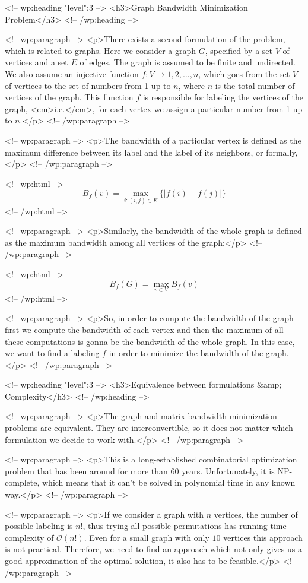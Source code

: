<!-- wp:heading {"level":3} -->
<h3>Graph Bandwidth Minimization Problem</h3>
<!-- /wp:heading -->

<!-- wp:paragraph -->
<p>There exists a second formulation of the problem, which is related to graphs. Here we consider a graph $G$, specified by a set $V$ of vertices and a set $E$ of edges. The graph is assumed to be finite and undirected. We also assume an injective function $f: V \rightarrow {1,2,\dots,n}$, which goes from the set $V$ of vertices to the set of numbers from 1 up to $n$, where $n$ is the total number of vertices of the graph. This function $f$ is responsible for labeling the vertices of the graph, <em>i.e.</em>, for each vertex we assign a particular number from 1 up to $n$.</p>
<!-- /wp:paragraph -->

<!-- wp:paragraph -->
<p>The bandwidth of a particular vertex is defined as the maximum difference between its label and the label of its neighbors, or formally,</p>
<!-- /wp:paragraph -->

<!-- wp:html -->
$$ B_f(v) = \max_{i:(i,j) \in E }\{|f(i) - f(j)|\} $$
<!-- /wp:html -->

<!-- wp:paragraph -->
<p>Similarly, the bandwidth of the whole graph is defined as the maximum bandwidth among all vertices of the graph:</p>
<!-- /wp:paragraph -->

<!-- wp:html -->
$$ B_f(G) = \max_{v \in V} B_f(v) $$
<!-- /wp:html -->

<!-- wp:paragraph -->
<p>So, in order to compute the bandwidth of the graph first we compute the bandwidth of each vertex and then the maximum of all these computations is gonna be the bandwidth of the whole graph. In this case, we want to find a labeling $f$ in order to minimize the bandwidth of the graph.</p>
<!-- /wp:paragraph -->

<!-- wp:heading {"level":3} -->
<h3>Equivalence between formulations &amp; Complexity</h3>
<!-- /wp:heading -->

<!-- wp:paragraph -->
<p>The graph and matrix bandwidth minimization problems are equivalent. They are interconvertible, so it does not matter which formulation we decide to work with.</p>
<!-- /wp:paragraph -->

<!-- wp:paragraph -->
<p>This is a long-established combinatorial optimization problem that has been around for more than 60 years. Unfortunately, it is NP-complete, which means that it can't be solved in polynomial time in any known way.</p>
<!-- /wp:paragraph -->

<!-- wp:paragraph -->
<p>If we consider a graph with $n$ vertices, the number of possible labeling is $n!$, thus trying all possible permutations has running time complexity of $\mathcal{O}(n!)$. Even for a small graph with only $10$ vertices this approach is not practical. Therefore, we need to find an approach which not only gives us a good approximation of the optimal solution, it also has to be feasible.</p>
<!-- /wp:paragraph -->

